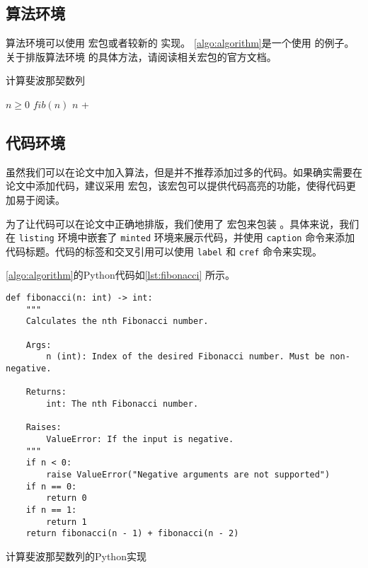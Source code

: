 \subsection{算法环境}

算法环境可以使用  宏包或者较新的  实现。
\cref{algo:algorithm}是一个使用  的例子。关于排版算法环境
的具体方法，请阅读相关宏包的官方文档。

\begin{algorithm}
  \caption{计算斐波那契数列}\label{algo:algorithm}
  \begin{algorithmic}[1]
    \Require $n \geq 0$
    \Ensure $fib(n)$
    \State \Return $n$
    \Else
    \State \Return {} + 
    \EndIf
    \EndFunction
  \end{algorithmic}
\end{algorithm}

\subsection{代码环境}

虽然我们可以在论文中加入算法，但是并不推荐添加过多的代码。如果确实需要在论文中添加代码，建议采用  宏包，该宏包可以提供代码高亮的功能，使得代码更加易于阅读。

为了让代码可以在论文中正确地排版，我们使用了  宏包来包装 。具体来说，我们在 \texttt{listing} 环境中嵌套了 \texttt{minted} 环境来展示代码，并使用 \texttt{caption} 命令来添加代码标题。代码的标签和交叉引用可以使用 \texttt{label} 和 \texttt{cref} 命令来实现。

\cref{algo:algorithm}的Python代码如\cref{lst:fibonacci} 所示。



\begin{listing}[htbp]
  \begin{verbatim}
def fibonacci(n: int) -> int:
    """
    Calculates the nth Fibonacci number.

    Args:
        n (int): Index of the desired Fibonacci number. Must be non-negative.

    Returns:
        int: The nth Fibonacci number.

    Raises:
        ValueError: If the input is negative.
    """
    if n < 0:
        raise ValueError("Negative arguments are not supported")
    if n == 0:
        return 0
    if n == 1:
        return 1
    return fibonacci(n - 1) + fibonacci(n - 2)
  \end{verbatim}
  \caption{计算斐波那契数列的Python实现}\label{lst:fibonacci}
\end{listing}

